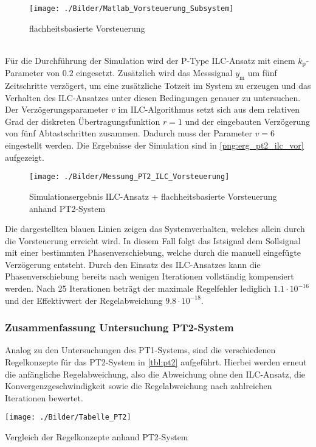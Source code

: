 \begin{figure}[ht]
	\centering
	\texttt{[image: ./Bilder/Matlab\_Vorsteuerung\_Subsystem]}
	\caption{flachheitsbasierte Vorsteuerung}
	\label{png:mat_vorsteuerung}
\end{figure}
\\
Für die Durchführung der Simulation wird der P-Type ILC-Ansatz mit einem $k_\mathrm{p}$-Parameter von $0.2$ eingesetzt. Zusätzlich wird das Messsignal $y_\mathrm{m}$ um fünf Zeitschritte verzögert, um eine zusätzliche Totzeit im System zu erzeugen und das Verhalten des ILC-Ansatzes unter diesen Bedingungen genauer zu untersuchen. Der Verzögerungsparameter $v$ im ILC-Algorithmus setzt sich aus dem relativen Grad der diskreten Übertragungsfunktion $r = 1$ und der eingebauten Verzögerung von fünf Abtastschritten zusammen. Dadurch muss der Parameter $v = 6$ eingestellt werden. Die Ergebnisse der Simulation sind in \autoref{png:erg_pt2_ilc_vor} aufgezeigt.
\begin{figure}[H]
	\centering
	\texttt{[image: ./Bilder/Messung\_PT2\_ILC\_Vorsteuerung]}
	\caption{Simulationsergebnis ILC-Ansatz + flachheitsbasierte Vorsteuerung anhand PT2-System}
	\label{png:erg_pt2_ilc_vor}
\end{figure}
Die dargestellten blauen Linien zeigen das Systemverhalten, welches allein durch die Vorsteuerung erreicht wird. In diesem Fall folgt das Istsignal dem Sollsignal mit einer bestimmten Phasenverschiebung, welche durch die manuell eingefügte Verzögerung entsteht. Durch den Einsatz des ILC-Ansatzes kann die Phasenverschiebung bereits nach wenigen Iterationen vollständig kompensiert werden. Nach 25 Iterationen beträgt der maximale Regelfehler lediglich $1.1\cdot10^{-16}$ und der Effektivwert der Regelabweichung $9.8\cdot10^{-18}$.

\subsubsection{Zusammenfassung Untersuchung PT2-System}
Analog zu den Untersuchungen des PT1-Systems, sind die verschiedenen Regelkonzepte für das PT2-System in \autoref{tbl:pt2} aufgeführt. Hierbei werden erneut die anfängliche Regelabweichung, also die Abweichung ohne den ILC-Ansatz, die Konvergenzgeschwindigkeit sowie die Regelabweichung nach zahlreichen Iterationen bewertet.
\begin{table}[h]
	\centering
	\texttt{[image: ./Bilder/Tabelle\_PT2]}
	\caption{Vergleich der Regelkonzepte anhand PT2-System}
	\label{tbl:pt2}
\end{table}

